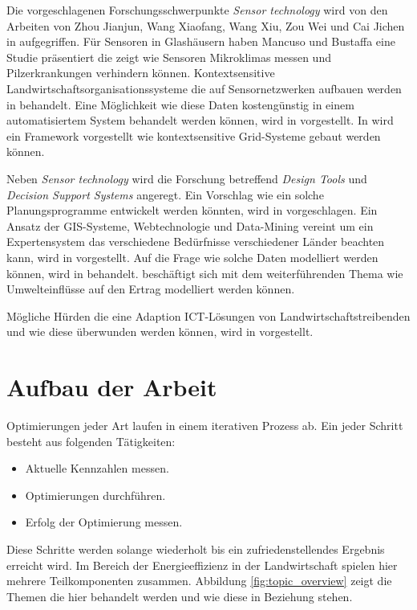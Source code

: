 Die vorgeschlagenen Forschungsschwerpunkte \textit{Sensor technology} wird von den Arbeiten von Zhou Jianjun, Wang Xiaofang, Wang Xiu, Zou Wei und Cai Jichen in \cite{proc:Zhou2013} aufgegriffen. Für Sensoren in Glashäusern haben Mancuso und Bustaffa eine Studie\cite{misc:Mancuso2006} präsentiert die zeigt wie Sensoren Mikroklimas messen und Pilzerkrankungen verhindern können. Kontextsensitive Landwirtschaftsorganisationssysteme die auf Sensornetzwerken aufbauen werden in \cite{proc:Khaydarov2012} behandelt. Eine Möglichkeit wie diese Daten kostengünstig in einem automatisiertem System behandelt werden können, wird in \cite{jour:Kamalesh2014} vorgestellt. In \cite{jour:Shaikh2010} wird ein Framework vorgestellt wie 	kontextsensitive Grid-Systeme gebaut werden können.

Neben \textit{Sensor technology} wird die Forschung betreffend \textit{Design Tools} und \textit{Decision Support Systems} angeregt. Ein Vorschlag wie ein solche Planungsprogramme entwickelt werden könnten, wird in \cite{art:Wang2011} vorgeschlagen. Ein Ansatz der GIS-Systeme, Webtechnologie und Data-Mining vereint um ein Expertensystem das verschiedene Bedürfnisse verschiedener Länder beachten kann, wird in \cite{jour:Zhu2009} vorgestellt. Auf die Frage wie solche Daten modelliert werden können, wird in \cite{jour:Schulze2007} behandelt. \cite{jour:Aqeel-ur-Rehman2011} beschäftigt sich mit dem weiterführenden Thema wie Umwelteinflüsse auf den Ertrag modelliert werden können.

Mögliche Hürden die eine Adaption ICT-Lösungen von Landwirtschaftstreibenden und wie diese überwunden werden können, wird in \cite{jour:Aubert2012} vorgestellt.

\section{Aufbau der Arbeit}

Optimierungen jeder Art laufen in einem iterativen Prozess ab. Ein jeder Schritt besteht aus folgenden Tätigkeiten: 

\begin{itemize}
	\item Aktuelle Kennzahlen messen.
	\item Optimierungen durchführen.
	\item Erfolg der Optimierung messen.
\end{itemize}

Diese Schritte werden solange wiederholt bis ein zufriedenstellendes Ergebnis erreicht wird. Im Bereich der Energieeffizienz in der Landwirtschaft spielen hier mehrere Teilkomponenten zusammen. Abbildung \ref{fig:topic_overview} zeigt die Themen die hier behandelt werden und wie diese in Beziehung stehen.


